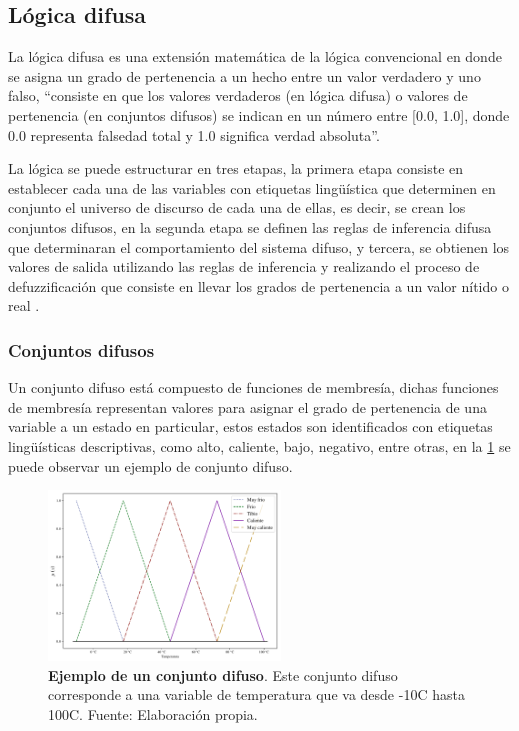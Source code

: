 	\subsection{Lógica difusa}
		
		La lógica difusa es una extensión matemática de la lógica convencional en donde se asigna un grado de pertenencia a un hecho entre un valor verdadero y uno falso, \enquote{consiste en que los valores verdaderos (en lógica difusa) o valores de pertenencia (en conjuntos difusos) se indican en un número entre [0.0, 1.0], donde 0.0 representa falsedad total y 1.0 significa verdad absoluta}\Parencite[p.$\,$4]{cruz2010inteligencia}.
		
		La lógica se puede estructurar en tres etapas, la primera etapa consiste en establecer cada una de las variables con etiquetas lingüística que determinen en conjunto el universo de discurso de cada una de ellas, es decir, se crean los conjuntos difusos, en la segunda etapa se definen las reglas de inferencia difusa que determinaran el comportamiento del sistema difuso, y tercera, se obtienen los valores de salida utilizando las reglas de inferencia y realizando el proceso de defuzzificación que consiste en llevar los grados de pertenencia a un valor nítido o real \Parencite{cruz2010inteligencia}.
		
		\subsubsection{Conjuntos difusos}
			
			Un conjunto difuso está compuesto de funciones de membresía, dichas funciones de membresía representan valores para asignar el grado de pertenencia de una variable a un estado en particular, estos estados son identificados con etiquetas lingüísticas descriptivas, como alto, caliente, bajo, negativo, entre otras, en la \cref{fig:FuzzySet} se puede observar un ejemplo de conjunto difuso.
			
			\begin{figure}[htb]
				\centering
				\includegraphics[width=0.55\textwidth]{FuzzySet.pdf}
				\caption[Ejemplo de un conjunto difuso]{\textbf{Ejemplo de un conjunto difuso}. Este conjunto difuso corresponde a una variable de temperatura que va desde -10\textdegree C hasta 100\textdegree C. Fuente: Elaboración propia.} 
				\label{fig:FuzzySet}
			\end{figure}
			
